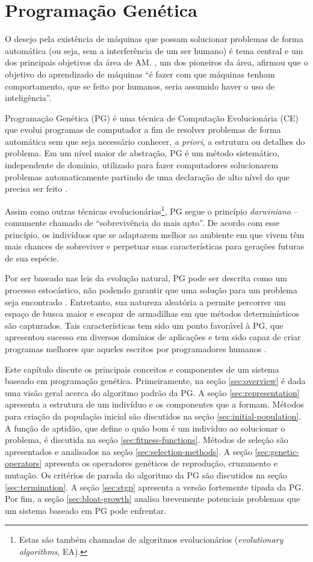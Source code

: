\chapter{Programação Genética} \label{chapter:genetic-programming}
O desejo pela existência de máquinas que possam solucionar problemas de forma automática (ou seja, sem a interferência de um ser humano) é tema central e um dos principais objetivos da área de AM. , um dos pioneiros da área, afirmou que o objetivo do aprendizado de máquinas ``é fazer com que máquinas tenham comportamento, que se feito por humanos, seria assumido haver o uso de inteligência''.

Programação Genética (PG) é uma técnica de Computação Evolucionária (CE) que evolui programas de computador a fim de resolver problemas de forma automática sem que seja necessário conhecer, \textit{a priori}, a estrutura ou detalhes do problema. Em um nível maior de abstração, PG é um método sistemático, independente de domínio, utilizado para fazer computadores solucionarem problemas automaticamente partindo de uma declaração de alto nível do que precisa ser feito \cite{poli2008}.

Assim como outras técnicas evolucionárias\footnote{Estas são também chamadas de algoritmos evolucionários (\textit{evolutionary algorithms}, EA).}, PG segue o princípio \textit{darwiniano} -- comumente chamado de ``sobrevivência do mais apto''. De acordo com esse princípio, os indivíduos que se adaptarem melhor ao ambiente em que vivem têm mais chances de sobreviver e perpetuar suas características para gerações futuras de sua espécie.

Por ser baseado nas leis da evolução natural, PG pode ser descrita como um processo estocástico, não podendo garantir que uma solução para um problema seja encontrado \cite{poli2008}. Entretanto, sua natureza aleatória a permite percorrer um espaço de busca maior e escapar de armadilhas em que métodos determinísticos são capturados. Tais características tem sido um ponto favorável à PG, que apresentou sucesso em diversos domínios de aplicações e tem sido capaz de criar programas melhores que aqueles escritos por programadores humanos \cite{banzhaf1998}.

Este capítulo discute os principais conceitos e componentes de um sistema baseado em programação genética. Primeiramente, na seção \ref{sec:overview} é dada uma visão geral acerca do algoritmo padrão da PG. A seção \ref{sec:representation} apresenta a estrutura de um indivíduo e os componentes que a formam. Métodos para criação da população inicial são discutidos na seção \ref{sec:initial-population}. A função de aptidão, que define o quão bom é um indivíduo ao solucionar o problema, é discutida na seção \ref{sec:fitness-functions}. Métodos de seleção são apresentados e analisados na seção \ref{sec:selection-methods}. A seção \ref{sec:genetic-operators} apresenta os operadores genéticos de reprodução, cruzamento e mutação. Os critérios de parada do algoritmo da PG são discutidos na seção \ref{sec:termination}. A seção \ref{sec:stgp} apresenta a versão fortemente tipada da PG. Por fim, a seção \ref{sec:bloat-growth} analisa brevemente potenciais problemas que um sistema baseado em PG pode enfrentar.

